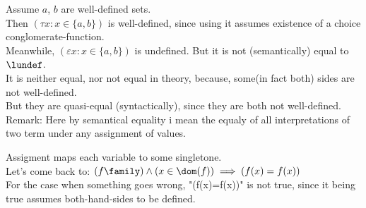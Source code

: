 



Assume $a$, $b$ are well-defined sets.\\
Then $
(\tau x: x \in \{a,b\}) 
$ is well-defined, since using it assumes existence of a choice conglomerate-function.\\
Meanwhile,
$
(\varepsilon x: x \in \{a,b\}) 
$
 is undefined. But it is not (semantically) equal to $\lundef$.\\
It is neither equal, nor not equal in theory, because, some(in fact both) sides are not well-defined.\\
But they are quasi-equal (syntactically), since they are both not well-defined.\\
 
Remark: 
Here by semantical equality i mean the equaly of all interpretations of two term under any assignment of values.

Assigment maps each variable to some singletone.\\
Let's come back to:
$(f\family)\land(x\in\dom(f)) \implies (f(x)=f(x))$\\
For the case when something goes wrong, "(f(x)=f(x))" is not true, since it being true assumes both-hand-sides to be defined.


